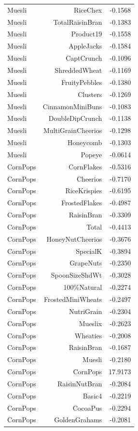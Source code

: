 \begin{longtable}{@{}lrr@{}}
Muesli & RiceChex & -0.1568 \\
Muesli & TotalRaisinBran & -0.1383 \\
Muesli & Product19 & -0.1558 \\
Muesli & AppleJacks & -0.1584 \\
Muesli & CaptCrunch & -0.1096 \\
Muesli & ShreddedWheat & -0.1169 \\
Muesli & FruityPebbles & -0.1380 \\
Muesli & Clusters & -0.1269 \\
Muesli & CinnamonMiniBuns & -0.1083 \\
Muesli & DoubleDipCrunch & -0.1138 \\
Muesli & MultiGrainCheerios & -0.1298 \\
Muesli & Honeycomb & -0.1303 \\
Muesli & Popeye & -0.0614 \\
CornPops & CornFlakes & -0.5316 \\
CornPops & Cheerios & -0.7170 \\
CornPops & RiceKrispies & -0.6195 \\
CornPops & FrostedFlakes & -0.4987 \\
CornPops & RaisinBran & -0.3309 \\
CornPops & Total & -0.4413 \\
CornPops & HoneyNutCheerios & -0.3676 \\
CornPops & SpecialK & -0.3894 \\
CornPops & GrapeNuts & -0.2350 \\
CornPops & SpoonSizeShdWt & -0.3028 \\
CornPops & 100\%Natural & -0.2274 \\
CornPops & FrostedMiniWheats & -0.2497 \\
CornPops & NutriGrain & -0.2304 \\
CornPops & Mueslix & -0.2623 \\
CornPops & Wheaties & -0.2008 \\
CornPops & RaisinBran & -0.1687 \\
CornPops & Muesli & -0.2180 \\
CornPops & CornPops & 17.9173 \\
CornPops & RaisinNutBran & -0.2084 \\
CornPops & Basic4 & -0.2219 \\
CornPops & CocoaPus & -0.2294 \\
CornPops & GoldenGrahams & -0.2081 \\

\end{longtable}

